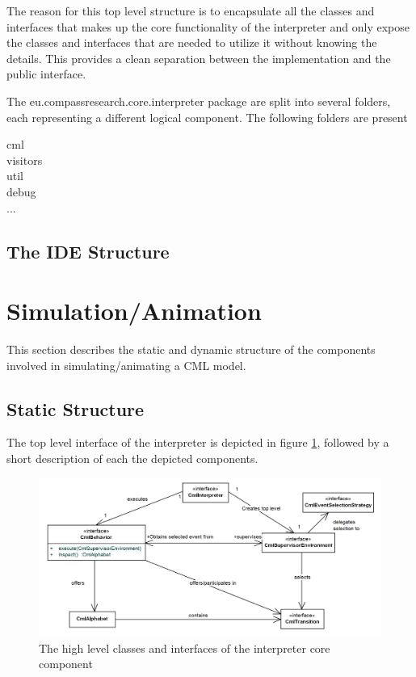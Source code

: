 \documentclass[a4paper, 12pt]{include/compassreport}   %
\begin{document}
The reason for this top level structure is to encapsulate all the
classes and interfaces that makes up the core functionality of the
interpreter and only expose the classes and interfaces that are needed
to utilize it without knowing the details. This provides a clean
separation between the implementation and the public interface.

The eu.compassresearch.core.interpreter package are split into several
folders, each representing a different logical component. The
following folders are present

\begin{description}
\item[cml] 
\item[visitors]
\item[util]
\item[debug]
\item[...]
\end{description}

\subsection{The IDE Structure}


\section{Simulation/Animation}
This section describes the static and dynamic structure of the
components involved in simulating/animating a CML model.

\subsection{Static Structure}
\label{sec:dynamic_structure}
The top level interface of the interpreter is depicted in figure
\ref{fig:interpreter_topLevelStructure}, followed by a short
description of each the depicted components.
\begin{figure}[ht!]
  \begin{center}
    \includegraphics[width=1\textwidth]{figures/toplevelStructure}
    \caption{The high level classes and interfaces of the interpreter core component}
    \label{fig:interpreter_topLevelStructure}
  \end{center}
\end{figure}
\end{document}
